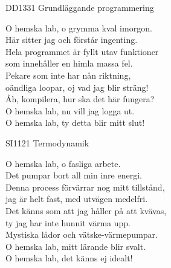 \documentclass[a6paper,10pt]{article}
\begin{document}
\begin{center}
\footnotesize DD1331 Grundläggande programmering\\
\end{center}
\begin{lyrics}
O hemska lab, o grymma kval imorgon. \\
Här sitter jag och förstår ingenting. \\
Hela programmet är fyllt utav funktioner\\
som innehåller en himla massa fel. 
\vspace{5pt} \\
Pekare som inte har nån riktning, \\
oändliga loopar, oj vad jag blir sträng!
\vspace{5pt} \\
Åh, kompilera, hur ska det här fungera? \\
O hemska lab, nu vill jag logga ut. \\
O hemska lab, ty detta blir mitt slut! 
\end{lyrics}

\begin{center}
\footnotesize SI1121 Termodynamik\\
\end{center}
\begin{lyrics}
O hemska lab, o fasliga arbete. \\
Det pumpar bort all min inre energi. \\
Denna process förvärrar nog mitt tillstånd, \\
jag är helt fast, med utvägen medelfri. 
\vspace{5pt} \\
Det känns som att jag håller på att kvävas, \\
ty jag har inte hunnit värma upp. 
\vspace{5pt} \\
Mystiska lådor och vätske-värmepumpar. \\
O hemska lab, mitt lärande blir svalt. \\
O hemska lab, det känns ej idealt! 
\end{lyrics}
\end{document}
